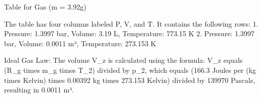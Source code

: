 Table for Gas (m = 3.92g)

The table has four columns labeled P, V, and T. It contains the following rows:
1. Pressure: 1.3997 bar, Volume: 3.19 L, Temperature: 773.15 K
2. Pressure: 1.3997 bar, Volume: 0.0011 m³, Temperature: 273.153 K

Ideal Gas Law:
The volume V_z is calculated using the formula:
V_z equals (R_g times m_g times T_2) divided by p_2, which equals (166.3 Joules per (kg times Kelvin) times 0.00392 kg times 273.153 Kelvin) divided by 139970 Pascals, resulting in 0.0011 m³.